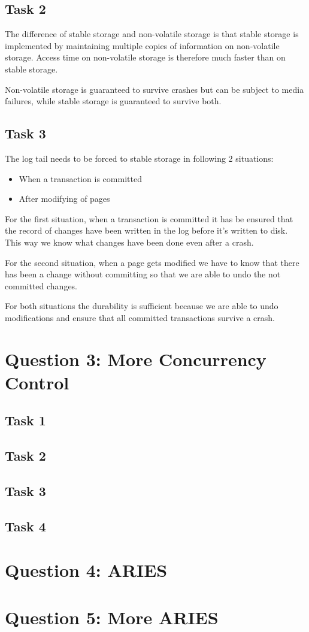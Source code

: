 \documentclass[12pt,a4paper]{article}
\begin{document}
\subsection{Task 2}
The difference of stable storage and non-volatile storage is that stable storage is implemented by maintaining multiple copies of information on non-volatile storage.
Access time on non-volatile storage is therefore much faster than on stable storage.

Non-volatile storage is guaranteed to survive crashes but can be subject to media failures, while stable storage is guaranteed to survive both.


\subsection{Task 3}
The log tail needs to be forced to stable storage in following 2 situations:
\begin{itemize}
	\item When a transaction is committed
	\item After modifying of pages	
\end{itemize}

For the first situation, when a transaction is committed it has be ensured that the record of changes have been written in the log before it's written to disk.
This way we know what changes have been done even after a crash.

For the second situation, when a page gets modified we have to know that there has been a change without committing so that we are able to undo the not committed changes. 

For both situations the durability is sufficient because we are able to undo modifications and ensure that all committed transactions survive a crash.

\section{Question 3: More Concurrency Control}
\subsection{Task 1}
\subsection{Task 2}
\subsection{Task 3}
\subsection{Task 4}

\section{Question 4: ARIES}

\section{Question 5: More ARIES}
\end{document}
